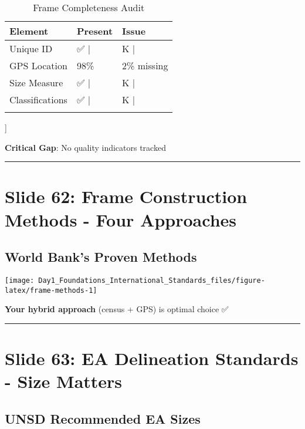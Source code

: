 \documentclass[
]{article}
\begin{document}
\begin{longtable}[t]{lll}
\caption{\label{tab:frame-gaps}Frame Completeness Audit}\\
\toprule
Element & Present & Issue\\
\midrule
Unique ID & ✅      | & K             |\\
GPS Location & 98\% & 2\% missing\\
Size Measure & ✅      | & K             |\\
Classifications & ✅      | & K             |\\
\cellcolor[HTML]{ffcccc}{Quality Indicators} & \cellcolor[HTML]{ffcccc}{❌      |} & \cellcolor[HTML]{ffcccc}{ot documented |}\\
\bottomrule
\end{longtable}

{]}

\textbf{Critical Gap}: No quality indicators tracked

\begin{center}\rule{0.5\linewidth}{0.5pt}\end{center}

\section{Slide 62: Frame Construction Methods - Four
Approaches}\label{slide-62-frame-construction-methods---four-approaches}

\subsection{World Bank's Proven
Methods}\label{world-banks-proven-methods}

\texttt{[image: Day1\_Foundations\_International\_Standards\_files/figure-latex/frame-methods-1]}

\textbf{Your hybrid approach} (census + GPS) is optimal choice ✅

\begin{center}\rule{0.5\linewidth}{0.5pt}\end{center}

\section{Slide 63: EA Delineation Standards - Size
Matters}\label{slide-63-ea-delineation-standards---size-matters}

\subsection{UNSD Recommended EA Sizes}\label{unsd-recommended-ea-sizes}
\end{document}

